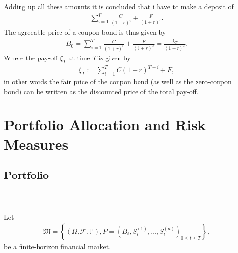 \documentclass{beamer}
\numberwithin{equation}{section}
\begin{document}
\begin{frame}\frametitle{{\normalsize \secname} \\ {\large \subsecname}}
    Adding up all these amounts it is concluded that i have to make a deposit of
    \begin{align}
        \sum_{i = 1}^T \frac{C}{(1 + r)^i} + \frac{F}{(1+r)^T}.
    \end{align}\pause
    The agreeable price of a coupon bond is thus given by
    \begin{align}
        B_0 =
        \sum_{i = 1}^T \frac{C}{(1 + r)^i} + \frac{F}{(1+r)^T} =
        \frac{\xi_T}{(1 + r)^T}.
    \end{align}\pause
    Where the pay-off $\xi_T$ at time $T$ is given by
    \begin{align}
        \xi_T := \sum_{i = 1}^T C(1 + r)^{T -i} + F,
    \end{align}\pause
    in other words the fair price of the coupon bond (as well as the zero-coupon bond) can be written as the discounted price of the total pay-off.
\end{frame}

\section{Portfolio Allocation and Risk Measures}

\subsection{Portfolio}

\begin{frame}\frametitle{{\normalsize \secname} \\ {\large \subsecname}}
    Let
        \begin{align}
            \mathfrak{M} = \left\{
                \left(
                    \Omega, \mathscr{F}, \mathbb{P}
                \right),
                P = \left(
                    B_t, S_t^{(1)}, \ldots, S_t^{(d)}
                \right)_{0 \leq t \leq T}
            \right\},
        \end{align}
        be a finite-horizon financial market.
\end{frame}
\end{document}
